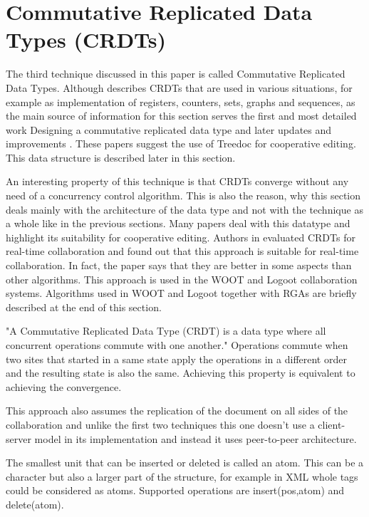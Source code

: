 \documentclass[12pt,oneside]{fithesis2}
\begin{document}
\section{Commutative Replicated Data Types (CRDTs)}
\par The third technique discussed in this paper is called Commutative Replicated Data Types. Although \cite{Shapiro-long} describes CRDTs that are used in various situations, for example as implementation of registers, counters, sets, graphs and sequences, as the main source of information for this section serves the first and most detailed work Designing a commutative replicated data type \cite{Shapiro-design} and later updates and improvements \cite{Shapiro-editing} \cite{Shapiro-consistency}. These papers suggest the use of Treedoc for cooperative editing. This data structure is described later in this section. 
\par An interesting property of this technique is that CRDTs converge without any need of a concurrency control algorithm. This is also the reason, why this section deals mainly with the architecture of the data type and not with the technique as a whole like in the previous sections. Many papers deal with this datatype and highlight its suitability for cooperative editing. Authors in \cite{CRDT-real} evaluated CRDTs for real-time collaboration and found out that this approach is suitable for real-time collaboration. In fact, the paper says that they are better in some aspects than other algorithms. This approach is used in the WOOT \cite{WOOT} and Logoot \cite{Logoot} collaboration systems. Algorithms used in WOOT and Logoot together with RGAs \cite{RGA} are briefly described at the end of this section.
\par "A Commutative Replicated Data Type (CRDT) is a data type where all concurrent operations commute with one another." \cite{Shapiro-design} Operations commute when two sites that started in a same state apply the operations in a different order and the resulting state is also the same. Achieving this property is equivalent to achieving the convergence.
\par This approach also assumes the replication of the document on all sides of the collaboration and unlike the first two techniques this one doesn't use a client-server model in its implementation and instead it uses peer-to-peer architecture.
\par The smallest unit that can be inserted or deleted is called an atom. This can be a character but also a larger part of the structure, for example in XML whole tags could be considered as atoms. Supported operations are insert(pos,atom) and delete(atom). 
\end{document}
